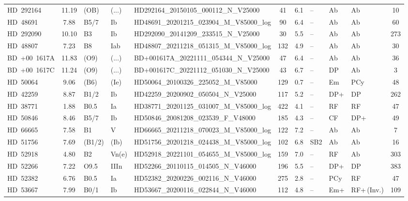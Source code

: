 {\begin{landscape}
\begin{longtable}{lclllcclllc}
\noalign{\smallskip}
HD~292164 & 11.19 & (OB) & (...) & HD292164\_20150105\_000112\_N\_V25000 & 41 & 6.1 & -- & Ab & Ab & 10 \\
\noalign{\smallskip}
HD~48691 & 7.88 & B5/7 & Ib & HD48691\_20201215\_023904\_M\_V85000\_log & 90 & 6.4 & -- & Ab & Ab & 60 \\
\noalign{\smallskip}
HD~292090 & 10.10 & B3 & Ib & HD292090\_20141209\_233515\_N\_V25000 & 30 & 5.5 & -- & Ab & Ab & 273 \\
\noalign{\smallskip}
HD~48807 & 7.23 & B8 & Iab & HD48807\_20211218\_051315\_M\_V85000\_log & 132 & 4.9 & -- & Ab & Ab & 30 \\
\noalign{\smallskip}
BD~+00~1617A & 11.83 & (O9) & (...) & BD+001617A\_20221111\_054344\_N\_V25000 & 47 & 6.4 & -- & Ab & Ab & 36 \\
\noalign{\smallskip}
BD~+00~1617C & 11.24 & (O9) & (...) & BD+001617C\_20221112\_051030\_N\_V25000 & 43 & 6.7 & -- & DP & Ab & 3 \\
\noalign{\smallskip}
HD~50064 & 9.06 & (B6) & (Ie) & HD50064\_20100326\_225052\_M\_V85000 & 129 & 0.7 & -- & Em & PCy & 48 \\
\noalign{\smallskip}
HD~42259 & 8.87 & B1/2 & Ib & HD42259\_20200902\_050504\_N\_V25000 & 117 & 5.2 & -- & DP+ & DP & 262 \\
\noalign{\smallskip}
HD~38771 & 1.88 & B0.5 & Ia & HD38771\_20201125\_031007\_M\_V85000\_log & 422 & 4.1 & -- & RF & RF & 47 \\
\noalign{\smallskip}
HD~50846 & 8.46 & B5/7 & Ib & HD50846\_20081208\_023539\_F\_V48000 & 185 & 4.3 & -- & CF & DP+ & 49 \\
\noalign{\smallskip}
HD~66665 & 7.58 & B1 & V & HD66665\_20211218\_070023\_M\_V85000\_log & 122 & 7.2 & -- & Ab & Ab & 7 \\
\noalign{\smallskip}
HD~51756 & 7.69 & (B1/2) & (Ib) & HD51756\_20201218\_024438\_M\_V85000\_log & 102 & 6.8 & SB2 & Ab & Ab & 16 \\
\noalign{\smallskip}
HD~52918 & 4.80 & B2 & Vn(e) & HD52918\_20221101\_054655\_M\_V85000\_log & 159 & 7.0 & -- & RF & Ab & 303 \\
\noalign{\smallskip}
HD~52266 & 7.22 & O9.5 & IIIn & HD52266\_20110115\_014505\_N\_V46000 & 196 & 5.5 & -- & DP+ & DP & 383 \\
\noalign{\smallskip}
HD~52382 & 6.76 & B0.5 & Ia & HD52382\_20200226\_002116\_N\_V46000 & 275 & 2.8 & -- & PCy & RF & 47 \\
\noalign{\smallskip}
HD~53667 & 7.99 & B0/1 & Ib & HD53667\_20200116\_022844\_N\_V46000 & 112 & 4.8 & -- & Em+ & RF+\,(Inv.) & 109 \\

\end{longtable}
\end{landscape}}

